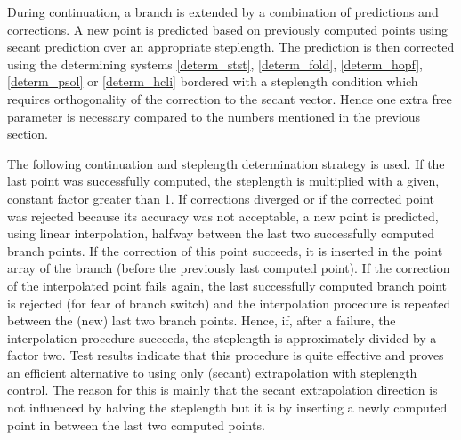 \documentclass[10pt]{scrartcl}
\begin{document}
{During continuation, a branch is extended by a combination of
predictions and corrections.  A new point is predicted based on
previously computed points using secant prediction over an appropriate
steplength. The prediction is then corrected using the determining
systems \eqref{determ_stst}, \eqref{determ_fold}, \eqref{determ_hopf},
\eqref{determ_psol} or \eqref{determ_hcli} bordered with a steplength
condition which requires orthogonality of the correction to the secant
vector.  Hence one extra free parameter is necessary compared to the
numbers mentioned in the previous section.
 
The following continuation and steplength determination strategy is
used.  If the last point was successfully computed, the steplength is
multiplied with a given, constant factor greater than 1.  If
corrections diverged or if the corrected point was rejected because
its accuracy was not acceptable, a new point is predicted, using
linear interpolation, halfway between the last two successfully
computed branch points.  If the correction of this point succeeds, it
is inserted in the point array of the branch (before the previously
last computed point).  If the correction of the interpolated point
fails again, the last successfully computed branch point is rejected
(for fear of branch switch) and the interpolation procedure is
repeated between the (new) last two branch points. Hence, if, after a
failure, the interpolation procedure succeeds, the steplength is
approximately divided by a factor two. Test results indicate that this
procedure is quite effective and proves an efficient alternative to
using only (secant) extrapolation with steplength control.  The reason
for this is mainly that the secant extrapolation direction is not
influenced by halving the steplength but it is by inserting a newly
computed point in between the last two computed points.

}
\end{document}
